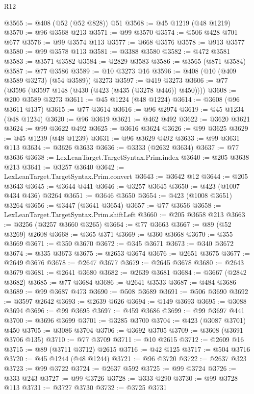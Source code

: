 \begin{lexlean}{R12}
\begin{coremodule}
@3565 := @408 (@52 (@52 @828)) @51
@3568 := @45 @1219 (@48 @1219)
@3570 := @96 @3568 @213
@3571 := @99 @3570
@3574 := @506 @428 @701 @677
@3576 := @99 @3574 @113
@3577 := @668 @3576
@3578 := @913 @3577
@3580 := @99 @3578 @113
@3581 := @3388 @3580
@3582 := @472 @3581
@3583 := @3571 @3582
@3584 := @2829 @3583
@3586 := @3565 (@871 @3584)
@3587 := @77 @3586
@3589 := @10 @3273 @16
@3596 := @408 (@10 (@409 @3589 @3273) (@54 @3589)) @3273
@3597 := @419 @3273
@3606 := @77 (@3596 (@3597 @148 (@430 (@423 (@435 (@3278 @446)) @450))))
@3608 := @200 @3589 @3273
@3611 := @45 @1224 (@48 @1224)
@3614 := @3608 (@96 @3611 @137)
@3615 := @77 @3614
@3616 := @96 @2974
@3619 := @45 @1234 (@48 @1234)
@3620 := @96 @3619
@3621 := @462 @492
@3622 := @3620 @3621
@3624 := @99 @3622 @492
@3625 := @3616 @3624
@3626 := @99 @3625
@3629 := @45 @1239 (@48 @1239)
@3631 := @96 @3629 @492
@3633 := @99 @3631 @113
@3634 := @3626 @3633
@3636 := @3333 (@2632 @3634)
@3637 := @77 @3636
@3638 := LexLeanTarget.TargetSyntax.Prim.index
@3640 := @205 @3638 @213
@3641 := @3257 @3640
@3642 := LexLeanTarget.TargetSyntax.Prim.convert
@3643 := @3642 @12
@3644 := @205 @3643
@3645 := @3644 @441
@3646 := @3257 @3645
@3650 := @423 (@1007 @434 @436) @3264
@3651 := @3646 @3650
@3654 := @423 (@1008 @3651) @3264
@3656 := @3447 (@3641 @3654)
@3657 := @77 @3656
@3658 := LexLeanTarget.TargetSyntax.Prim.shiftLeft
@3660 := @205 @3658 @213
@3663 := @3256 (@3257 @3660 @3265)
@3664 := @77 @3663
@3667 := @89 (@52 @3269) @2608
@3668 := @365 @371
@3669 := @360 @3668
@3670 := @355 @3669
@3671 := @350 @3670
@3672 := @345 @3671
@3673 := @340 @3672
@3674 := @335 @3673
@3675 := @2653 @3674
@3676 := @2651 @3675
@3677 := @2649 @3676
@3678 := @2647 @3677
@3679 := @2645 @3678
@3680 := @2643 @3679
@3681 := @2641 @3680
@3682 := @2639 @3681
@3684 := @3667 (@2842 @3682)
@3685 := @77 @3684
@3686 := @2641 @3533
@3687 := @484 @3686
@3689 := @99 @3687 @473
@3690 := @508 @3689
@3691 := @506 @3690
@3692 := @3597 @2642
@3693 := @2639 @626
@3694 := @149 @3693
@3695 := @3088 @3694
@3696 := @99 @3695
@3697 := @459 @3686
@3699 := @99 @3697 @441
@3700 := @3696 @3699
@3701 := @3285 @3700
@3704 := @423 (@3087 @3701) @450
@3705 := @3086 @3704
@3706 := @3692 @3705
@3709 := @3608 (@3691 @3706 @135)
@3710 := @77 @3709
@3711 := @10 @2615
@3712 := @2609 @16
@3715 := @89 (@3711 @3712) @2615
@3716 := @42 @125
@3717 := @504 @3716
@3720 := @45 @1244 (@48 @1244)
@3721 := @96 @3720
@3722 := @2637 @323
@3723 := @99 @3722
@3724 := @2637 @592
@3725 := @99 @3724
@3726 := @333 @243
@3727 := @99 @3726
@3728 := @333 @290
@3730 := @99 @3728 @113
@3731 := @3727 @3730
@3732 := @3725 @3731

\end{coremodule}
\end{lexlean}
